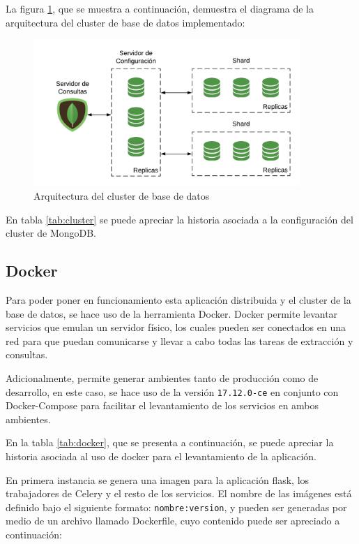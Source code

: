 La figura \ref{fig:mongo_cluster}, que se muestra a continuación, demuestra el diagrama de la arquitectura del cluster de base de datos implementado:

\begin{figure}[H]
	\centering
		\includegraphics[width=0.9\textwidth]{figures/mongo_cluster}
	\caption{Arquitectura del cluster de base de datos}
	\label{fig:mongo_cluster}
\end{figure}

En tabla \ref{tab:cluster} se puede apreciar la historia asociada a la configuración del cluster de MongoDB.



\subsection{Docker}

Para poder poner en funcionamiento esta aplicación distribuida y el cluster de la base de datos, se hace uso de la herramienta Docker.
Docker permite levantar servicios que emulan un servidor físico, los cuales pueden ser conectados en una red para que puedan comunicarse y llevar a cabo todas las tareas de extracción y consultas.

Adicionalmente, permite generar ambientes tanto de producción como de desarrollo, en este caso, se hace uso de la versión \texttt{17.12.0-ce} en conjunto con Docker-Compose para facilitar el levantamiento de los servicios en ambos ambientes.

En la tabla \ref{tab:docker}, que se presenta a continuación, se puede apreciar la historia asociada al uso de docker para el levantamiento de la aplicación.



En primera instancia se genera una imagen para la aplicación flask, los trabajadores de Celery y el resto de los servicios.
El nombre de las imágenes está definido bajo el siguiente formato: \texttt{nombre:version}, y pueden ser generadas por medio de un archivo llamado Dockerfile, cuyo contenido puede ser apreciado a continuación:

